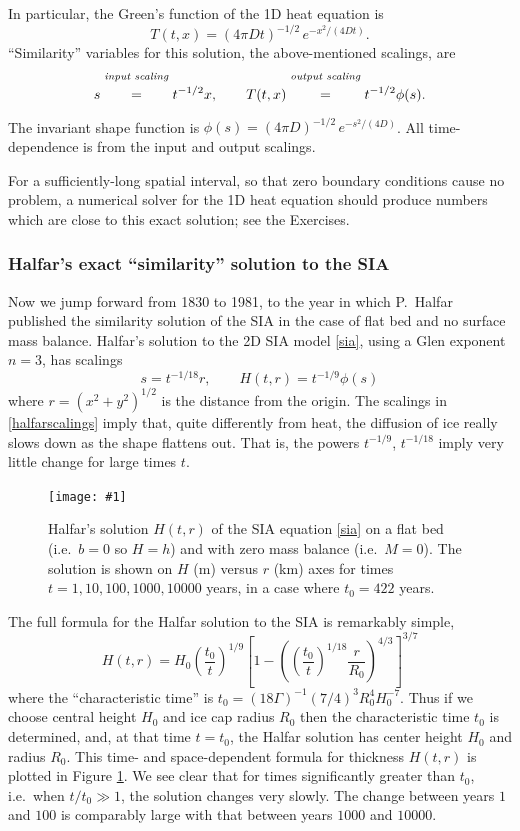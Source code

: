\documentclass[titlepage,a4paper,final,12pt]{scrartcl}
\newcommand{\onefigsize}[3]{
\begin{figure}[ht]
\centering
\texttt{[image: \#1]}
\caption{#2}
\label{fig:#1}
\end{figure}}
\begin{document}
In particular, the Green's function of the 1D heat equation is
  $$T(t,x) = (4 \pi D t)^{-1/2}\, e^{-x^2/(4Dt)}.$$
``Similarity'' variables for this solution, the above-mentioned scalings, are
	$$s \stackrel{\text{\emph{input scaling}}}{\phantom{\Big|}=\phantom{\Big|}} t^{-1/2} x, \qquad T(t,x) \stackrel{\text{\emph{output scaling}}}{\phantom{\Big|}=\phantom{\Big|}} t^{-1/2} \phi(s).$$
The invariant shape function is $\phi(s) = (4 \pi D)^{-1/2}\, e^{-s^2/(4D)}$.  All time-dependence is from the input and output scalings.

For a sufficiently-long spatial interval, so that zero boundary conditions cause no problem, a numerical solver for the 1D heat equation should produce numbers which are close to this exact solution; see the Exercises.

\subsubsection*{Halfar's exact ``similarity'' solution to the SIA}  Now we jump forward from 1830 to 1981, to the year in which P.~Halfar published the similarity solution of the SIA in the case of flat bed and no surface mass balance.  Halfar's solution to the 2D SIA model \eqref{sia}, using a Glen exponent $n=3$, has scalings
\begin{equation}
s = t^{-1/18} r, \qquad H(t,r)=t^{-1/9} \phi(s) \label{halfarscalings}
\end{equation}
where $r=(x^2+y^2)^{1/2}$ is the distance from the origin.  The scalings in \eqref{halfarscalings} imply that, quite differently from heat, the diffusion of ice really slows down as the shape flattens out.  That is, the powers $t^{-1/9}$, $t^{-1/18}$ imply very little change for large times $t$.

\onefigsize{siascaling}{Halfar's solution $H(t,r)$ of the SIA equation \eqref{sia} on a flat bed (i.e.~$b=0$ so $H=h$) and with zero mass balance (i.e.~$M=0$).  The solution is shown on $H$ (m) versus $r$ (km) axes for times $t=1,10,100,1000,10000$ years, in a case where $t_0=422$ years.}{5.5in}

The full formula for the Halfar solution to the SIA is remarkably simple,
\begin{equation}
H(t,r) = H_0 \left(\frac{t_0}{t}\right)^{1/9} \left[1 - \left(\left(\frac{t_0}{t}\right)^{1/18} \frac{r}{R_0}\right)^{4/3}\right]^{3/7} \label{halfar}
\end{equation}
where the ``characteristic time'' is $t_0 = (18 \Gamma)^{-1} (7/4)^3 R_0^4 H_0^{-7}$.  Thus if we choose central height $H_0$ and ice cap radius $R_0$ then the characteristic time $t_0$ is determined, and, at that time $t=t_0$, the Halfar solution has center height $H_0$ and radius $R_0$.  This time- and space-dependent formula for thickness $H(t,r)$ is plotted in Figure \ref{fig:siascaling}.  We see clear that for times significantly greater than $t_0$, i.e.~when $t/t_0 \gg 1$, the solution changes very slowly.  The change between years $1$ and $100$ is comparably large with that between years $1000$ and $10000$.
\end{document}
